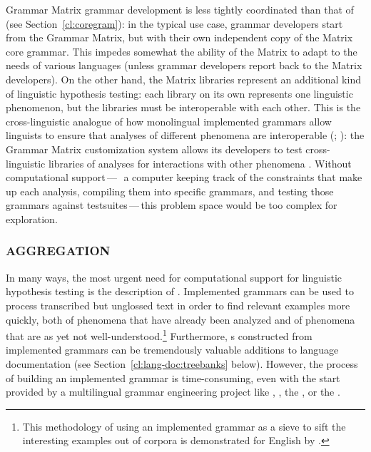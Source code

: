 \documentclass[output=paper,nonflat]{langsci/langscibook}
\begin{document}
Grammar Matrix grammar development is less tightly coordinated than
that of  (see Section~\ref{cl:coregram}): in the typical use case,
grammar developers start from the Grammar Matrix, but with their own
independent copy of the Matrix core grammar. This impedes somewhat the
ability of the Matrix to adapt to the needs of various languages
(unless grammar developers report back to the Matrix developers).  On
the other hand, the Matrix libraries represent an additional kind of
linguistic hypothesis testing: each library on its own represents one
linguistic phenomenon, but the libraries must be interoperable with
each other. This is the cross-linguistic analogue of how monolingual
implemented grammars allow linguists to ensure that analyses of
different phenomena are interoperable
(\citealt[p.439--440]{Mueller99a}; \citealt{Bender2008c}): the Grammar Matrix customization
system allows its developers to test cross-linguistic libraries of
analyses for interactions with other phenomena
\citep{BFO2011a-u,Bender:16}. Without computational
support\,---\,\ie\ a computer keeping track of the constraints that
make up each analysis, compiling them into specific grammars, and
testing those grammars against testsuites\,---\,this problem space
would be too complex for exploration.


\subsubsection{AGGREGATION}
\label{cl:lang-doc:aggr}


In many ways, the most urgent need for computational support for
linguistic hypothesis testing is the description of . Implemented grammars can be used to process transcribed but
unglossed text in order to find relevant examples more quickly, both
of phenomena that have already been analyzed and of phenomena that are
as yet not well-understood.\footnote{This methodology of using an
  implemented grammar as a sieve to sift the interesting examples out
  of corpora is demonstrated for English by \cite{Baldwin-et-al-05}.}
Furthermore, s constructed from implemented grammars can be
tremendously valuable additions to language documentation (see
Section~\ref{cl:lang-doc:treebanks} below). However, the process of building an
implemented grammar is time-consuming, even with the start provided by
a multilingual grammar engineering project like ,  \citep{BDKMR02a-u,Kin:For:Kuh:But:05}, the  \cite{Ranta:09}, or the
.
\end{document}
